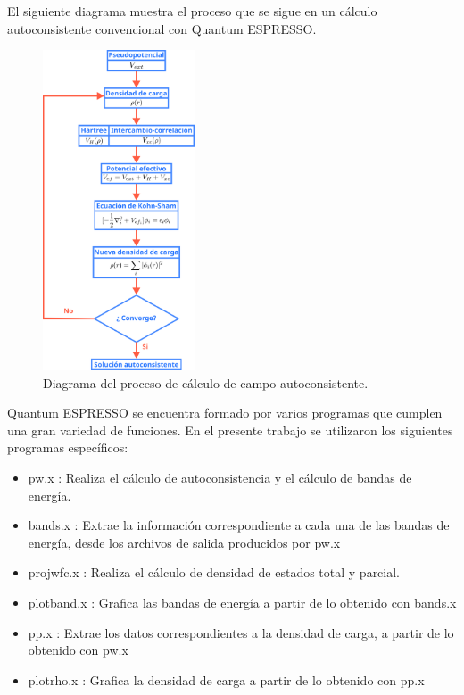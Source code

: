 El siguiente diagrama muestra el proceso que se sigue en un c\'alculo autoconsistente convencional con Quantum ESPRESSO.

\begin{figure}[H]
	\centering
	\includegraphics[width=0.4\textwidth]{contenido/calculos_computacionales/suite_qe/img_suite_qe/BucleAutoconsistente.png}
	\caption[Diagrama del proceso de c\'alculo de campo 
	autoconsistente]{Diagrama del proceso de c\'alculo de campo 
		autoconsistente.}
\end{figure}

Quantum ESPRESSO se encuentra formado por varios programas que cumplen una 
gran variedad de funciones. En el presente trabajo se utilizaron 
los siguientes programas espec\'ificos:

\begin{itemize}
    \item pw.x : Realiza el c\'alculo de autoconsistencia y el c\'alculo de 
    bandas de energ\'ia.
    \item bands.x : Extrae la informaci\'on correspondiente a cada una 
    de las bandas de energ\'ia, desde los archivos de salida producidos por pw.x
    \item projwfc.x : Realiza el c\'alculo de densidad de estados total y 
    parcial.
    \item plotband.x : Grafica las bandas de energ\'ia a partir de lo obtenido 
    con bands.x
    \item pp.x : Extrae los datos correspondientes a la densidad de carga, a 
    partir de lo obtenido con pw.x
    \item plotrho.x : Grafica la densidad de carga a partir de lo obtenido con 
    pp.x
\end{itemize}

